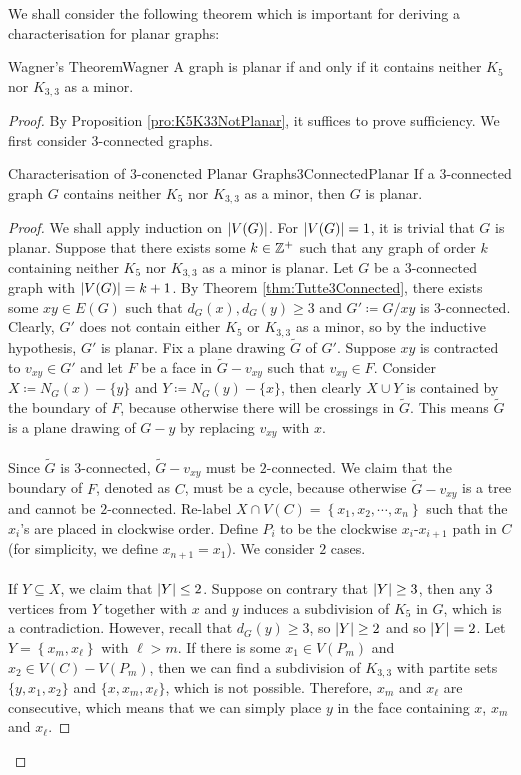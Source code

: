 \documentclass[math, code]{amznotes}
\theoremstyle{remark}
\begin{document}
We shall consider the following theorem which is important for deriving a characterisation for planar graphs:
\begin{thmbox}{Wagner's Theorem}{Wagner}
    A graph is planar if and only if it contains neither $K_5$ nor $K_{3, 3}$ as a minor.
    \tcblower
    \begin{proof}
        By Proposition \ref{pro:K5K33NotPlanar}, it suffices to prove sufficiency. We first consider $3$-connected graphs.
        \begin{lembox}{Characterisation of $3$-conencted Planar Graphs}{3ConnectedPlanar}
            If a $3$-connected graph $G$ contains neither $K_5$ nor $K_{3, 3}$ as a minor, then $G$ is planar.
            \tcblower
            \begin{proof}
                We shall apply induction on ${\left\lvert {V(G)} \right\rvert}$. For ${\left\lvert {V(G)} \right\rvert} = 1$, it is trivial that $G$ is planar. Suppose that there exists some $k \in \mathbb{Z}^+$ such that any graph of order $k$ containing neither $K_5$ nor $K_{3, 3}$ as a minor is planar. Let $G$ be a $3$-connected graph with ${\left\lvert {V(G)} \right\rvert} = k + 1$. By Theorem \ref{thm:Tutte3Connected}, there exists some $xy \in E(G)$ such that $d_G(x), d_G(y) \geq 3$ and $G' \coloneqq G/xy$ is $3$-connected. Clearly, $G'$ does not contain either $K_5$ or $K_{3, 3}$ as a minor, so by the inductive hypothesis, $G'$ is planar. Fix a plane drawing $\tilde{G}$ of $G'$. Suppose $xy$ is contracted to $v_{xy} \in G'$ and let $F$ be a face in $\tilde{G} - v_{xy}$ such that $v_{xy} \in F$. Consider $X \coloneqq N_G(x) - \{y\}$ and $Y \coloneqq N_G(y) - \{x\}$, then clearly $X \cup Y$ is contained by the boundary of $F$, because otherwise there will be crossings in $\tilde{G}$. This means $\tilde{G}$ is a plane drawing of $G - y$ by replacing $v_{xy}$ with $x$.
                \\\\ 
                Since $\tilde{G}$ is $3$-connected, $\tilde{G} - v_{xy}$ must be $2$-connected. We claim that the boundary of $F$, denoted as $C$, must be a cycle, because otherwise $\tilde{G} - v_{xy}$ is a tree and cannot be $2$-connected. Re-label $X \cap V(C) = \left\{x_1, x_2, \cdots, x_n\right\}$ such that the $x_i$'s are placed in clockwise order. Define $P_i$ to be the clockwise $x_i$-$x_{i + 1}$ path in $C$ (for simplicity, we define $x_{n + 1} = x_1$). We consider $2$ cases.
                \\\\
                If $Y \subseteq X$, we claim that ${\left\lvert {Y} \right\rvert} \leq 2$. Suppose on contrary that ${\left\lvert {Y} \right\rvert} \geq 3$, then any $3$ vertices from $Y$ together with $x$ and $y$ induces a subdivision of $K_5$ in $G$, which is a contradiction. However, recall that $d_G(y) \geq 3$, so ${\left\lvert {Y} \right\rvert} \geq 2$ and so ${\left\lvert {Y} \right\rvert} = 2$. Let $Y = \left\{x_m, x_{\ell}\right\}$ with $\ell > m$. If there is some $x_1 \in V(P_m)$ and $x_2 \in V(C) - V(P_m)$, then we can find a subdivision of $K_{3, 3}$ with partite sets $\{y, x_1, x_2\}$ and $\{x, x_m, x_{\ell}\}$, which is not possible. Therefore, $x_m$ and $x_{\ell}$ are consecutive, which means that we can simply place $y$ in the face containing $x$, $x_m$ and $x_{\ell}$.

\end{proof}
\end{lembox}
\end{proof}
\end{thmbox}
\end{document}
